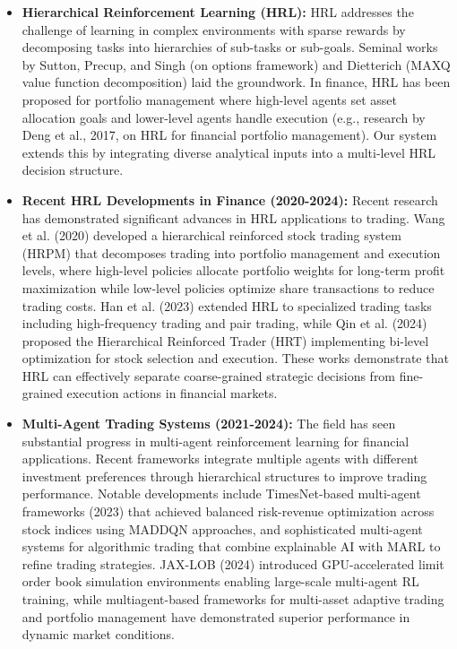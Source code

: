 \documentclass[11pt]{article}
\begin{document}
\begin{itemize}
\item   \textbf{Hierarchical Reinforcement Learning (HRL):} HRL addresses the challenge of learning in complex environments with sparse rewards by decomposing tasks into hierarchies of sub-tasks or sub-goals. Seminal works by Sutton, Precup, and Singh (on options framework) and Dietterich (MAXQ value function decomposition) laid the groundwork. In finance, HRL has been proposed for portfolio management where high-level agents set asset allocation goals and lower-level agents handle execution (e.g., research by Deng et al., 2017, on HRL for financial portfolio management). Our system extends this by integrating diverse analytical inputs into a multi-level HRL decision structure.

\item   \textbf{Recent HRL Developments in Finance (2020-2024):} Recent research has demonstrated significant advances in HRL applications to trading. Wang et al. (2020) developed a hierarchical reinforced stock trading system (HRPM) that decomposes trading into portfolio management and execution levels, where high-level policies allocate portfolio weights for long-term profit maximization while low-level policies optimize share transactions to reduce trading costs. Han et al. (2023) extended HRL to specialized trading tasks including high-frequency trading and pair trading, while Qin et al. (2024) proposed the Hierarchical Reinforced Trader (HRT) implementing bi-level optimization for stock selection and execution. These works demonstrate that HRL can effectively separate coarse-grained strategic decisions from fine-grained execution actions in financial markets.

\item   \textbf{Multi-Agent Trading Systems (2021-2024):} The field has seen substantial progress in multi-agent reinforcement learning for financial applications. Recent frameworks integrate multiple agents with different investment preferences through hierarchical structures to improve trading performance. Notable developments include TimesNet-based multi-agent frameworks (2023) that achieved balanced risk-revenue optimization across stock indices using MADDQN approaches, and sophisticated multi-agent systems for algorithmic trading that combine explainable AI with MARL to refine trading strategies. JAX-LOB (2024) introduced GPU-accelerated limit order book simulation environments enabling large-scale multi-agent RL training, while multiagent-based frameworks for multi-asset adaptive trading and portfolio management have demonstrated superior performance in dynamic market conditions.


\end{itemize}
\end{document}
